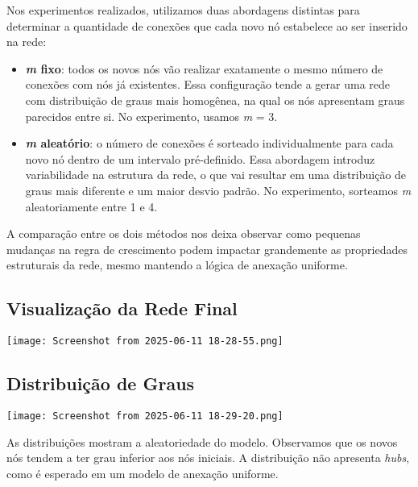 \documentclass{article}
\begin{document}
Nos experimentos realizados, utilizamos duas abordagens distintas para determinar a quantidade de conexões que cada novo nó estabelece ao ser inserido na rede:

\begin{itemize}
    \item \textbf{\textit{m} fixo}: todos os novos nós vão realizar exatamente o mesmo número de conexões com nós já existentes. Essa configuração tende a gerar uma rede com distribuição de graus mais homogênea, na qual os nós apresentam graus parecidos entre si. No experimento, usamos \textit{m} = 3.

    \item \textbf{\textit{m} aleatório}: o número de conexões é sorteado individualmente para cada novo nó dentro de um intervalo pré-definido. Essa abordagem introduz variabilidade na estrutura da rede, o que vai resultar em uma distribuição de graus mais diferente e um maior desvio padrão. No experimento, sorteamos \textit{m} aleatoriamente entre 1 e 4.
\end{itemize}

A comparação entre os dois métodos nos deixa observar como pequenas mudanças na regra de crescimento podem impactar grandemente as propriedades estruturais da rede, mesmo mantendo a lógica de anexação uniforme.

\vspace{0.5cm}

\subsection*{Visualização da Rede Final}

\begin{center}
    \texttt{[image: Screenshot from 2025-06-11 18-28-55.png]}
\end{center}

\vspace{0.5cm}

\subsection*{Distribuição de Graus}

\begin{center}
    \texttt{[image: Screenshot from 2025-06-11 18-29-20.png]}
\end{center}

As distribuições mostram a aleatoriedade do modelo. Observamos que os novos nós tendem a ter grau inferior aos nós iniciais. A distribuição não apresenta \textit{hubs}, como é esperado em um modelo de anexação uniforme.
\end{document}
